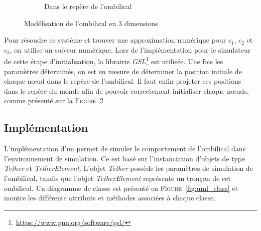 \begin{figure}[!htb]
\begin{subfigure}[b]{0.45\textwidth}
						\caption{Dans le repère de l'ombilical}
						\label{fig:2d_plot}
					\end{subfigure}
					\caption{Modélisation de l'ombilical en 3 dimensions}
					\label{fig:tether_plot}
				\end{figure}
				
				Pour résoudre ce système et trouver une approximation numérique pour $c_1$, $c_2$ et $c_3$, on utilise un solveur numérique. Lors de l'implémentation pour le simulateur de cette étape d'initialisation, la librairie \textit{GSL}\footnote{\url{https://www.gnu.org/software/gsl/}} est utilisée. Une fois les paramètres déterminés, on est en mesure de déterminer la position initiale de chaque n\oe ud dans le repère de l'ombilical. Il faut enfin projeter ces positions dans le repère du monde afin de pouvoir correctement initialiser chaque n\oe uds, comme présenté sur la \textsc{Figure}~\ref{fig:tether_plot}
			
			\subsection{Implémentation}
				L'implémentation d'un \plugin{} \gazebo{} permet de simuler le comportement de l'ombilical dans l'environnement de simulation. Ce \plugin{} est basé sur l'instanciation d'objets de type \textit{Tether} et \textit{TetherElement}. L'objet \textit{Tether} possède les paramètres de simulation de l'ombilical, tandis que l'objet \textit{TetherElement} représente un tronçon de cet ombilical. Un diagramme de classe est présenté en \textsc{Figure}~\ref{fig:uml_class} et montre les différents attributs et méthodes associées à chaque classe.

